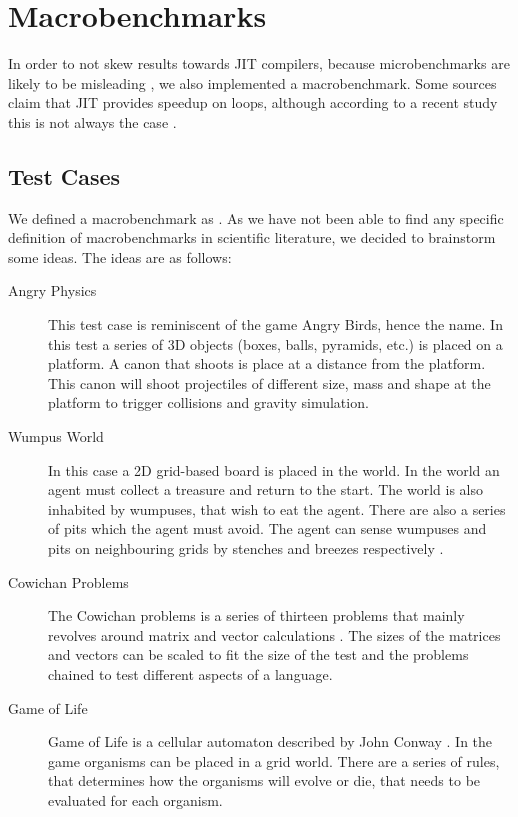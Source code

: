 \section{Macrobenchmarks}\label{sec:macrobenchmarks}
In order to not skew results towards \ac{JIT} compilers, because microbenchmarks are likely to be misleading \cite{sestoft2013microbenchmarks, microbenchmarkmislead}, we also implemented a macrobenchmark.
Some sources claim that \ac{JIT} provides speedup on loops, although according to a recent study this is not always the case \cite{vmwarmup}.

\subsection{Test Cases}
We defined a macrobenchmark as . As we have not been able to find any specific definition of macrobenchmarks in scientific literature, we decided to brainstorm some ideas. The ideas are as follows:
\begin{description}
    \item[Angry Physics] This test case is reminiscent of the game Angry Birds, hence the name. In this test a series of 3D objects (boxes, balls, pyramids, etc.) is placed on a platform. A canon that shoots is place at a distance from the platform. This canon will shoot projectiles of different size, mass and shape at the platform to trigger collisions and gravity simulation.
    \item[Wumpus World] In this case a 2D grid-based board is placed in the world. In the world an agent must collect a treasure and return to the start. The world is also inhabited by wumpuses, that wish to eat the agent. There are also a series of pits which the agent must avoid. The agent can sense wumpuses and pits on neighbouring grids by stenches and breezes respectively \cite{wumpus:world}.
    \item[Cowichan Problems] The Cowichan problems is a series of thirteen problems that mainly revolves around matrix and vector calculations \cite{wilson1995assessing}. The sizes of the matrices and vectors can be scaled to fit the size of the test and the problems chained to test different aspects of a language.
    \item[Game of Life] Game of Life is a cellular automaton described by John Conway \cite{game:of:life}. In the game organisms can be placed in a grid world. There are a series of rules, that determines how the organisms will evolve or die, that needs to be evaluated for each organism.
\end{description}

